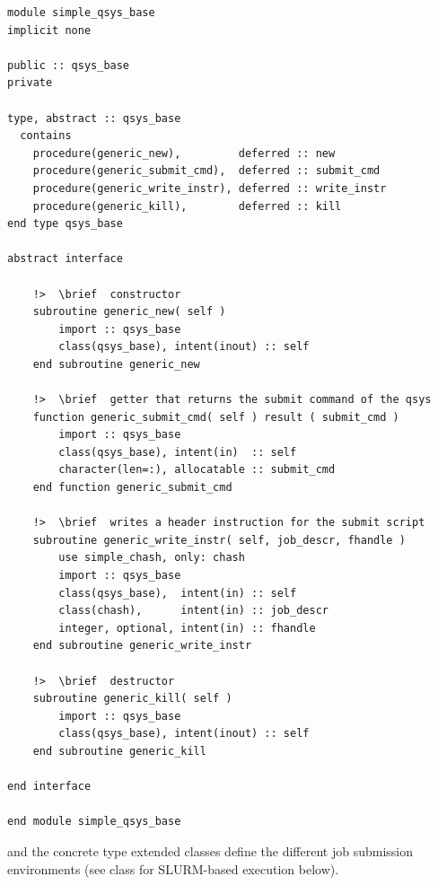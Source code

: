 \documentclass[a4paper,11pt]{article}
\begin{document}
\begin{verbatim}
module simple_qsys_base
implicit none

public :: qsys_base
private

type, abstract :: qsys_base
  contains
    procedure(generic_new),         deferred :: new
    procedure(generic_submit_cmd),  deferred :: submit_cmd
    procedure(generic_write_instr), deferred :: write_instr
    procedure(generic_kill),        deferred :: kill
end type qsys_base

abstract interface

    !>  \brief  constructor
    subroutine generic_new( self )
        import :: qsys_base
        class(qsys_base), intent(inout) :: self
    end subroutine generic_new
    
    !>  \brief  getter that returns the submit command of the qsys
    function generic_submit_cmd( self ) result ( submit_cmd )
        import :: qsys_base
        class(qsys_base), intent(in)  :: self
        character(len=:), allocatable :: submit_cmd
    end function generic_submit_cmd
    
    !>  \brief  writes a header instruction for the submit script
    subroutine generic_write_instr( self, job_descr, fhandle )
        use simple_chash, only: chash
        import :: qsys_base
        class(qsys_base),  intent(in) :: self
        class(chash),      intent(in) :: job_descr
        integer, optional, intent(in) :: fhandle   
    end subroutine generic_write_instr

    !>  \brief  destructor
    subroutine generic_kill( self )
        import :: qsys_base
        class(qsys_base), intent(inout) :: self
    end subroutine generic_kill
    
end interface

end module simple_qsys_base
\end{verbatim}
and the concrete type extended classes define the different job submission environments (see class for SLURM-based execution below).
\end{document}

